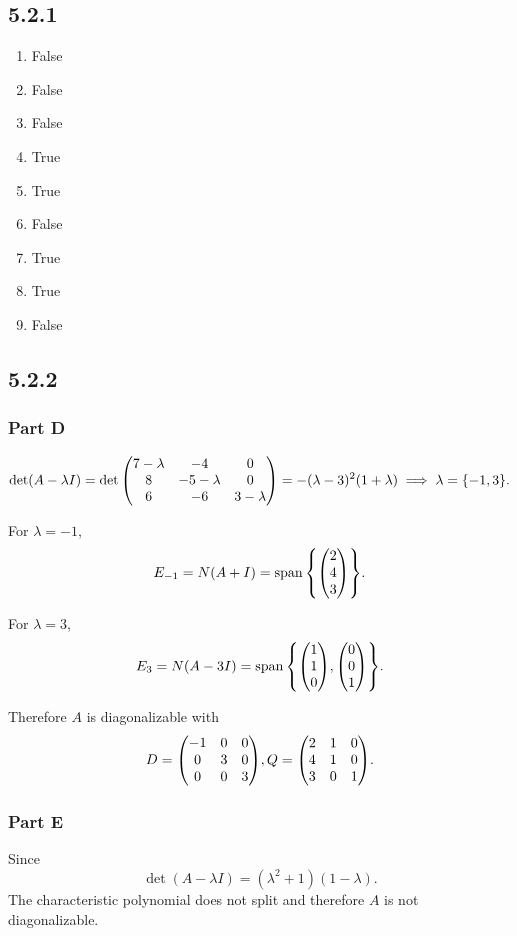 \documentclass[12pt,titlepage]{extarticle}
\begin{document}
\subsection*{5.2.1}
\begin{enumerate}[label=\alph*)]
    \item False
    \item False
    \item False
    \item True
    \item True
    \item False
    \item True
    \item True
    \item False
\end{enumerate}

\subsection*{5.2.2}
\subsubsection*{Part D}
\[
    \det(A - \lambda I) = \det\mqty(
    7 - \lambda & -4 & 0 \\
    8 & -5 - \lambda & 0 \\
    6 & -6 & 3 - \lambda
    ) = -(\lambda - 3)^2 (1 + \lambda) \implies \lambda = \qty{-1, 3}
.\]

For $\lambda = -1$,
\[
    E_{-1} = N(A + I) = \spann\qty{
        \mqty(2 \\ 4 \\ 3)
    }
.\]

For $\lambda = 3$,
\[
    E_3 = N(A - 3I) = \spann\qty{
        \mqty(1 \\ 1 \\ 0),
        \mqty(0 \\ 0 \\ 1)
    }
.\]

Therefore $A$ is diagonalizable with
\[
    D = \mqty(\dmat[0]{-1, 3, 3}), Q = \mqty(
    2 & 1 & 0 \\
    4 & 1 & 0 \\
    3 & 0 & 1
    )
.\]

\subsubsection*{Part E}
Since \[
    \det(A - \lambda I) = (\lambda^2 + 1)(1-\lambda) 
.\]
The characteristic polynomial does not split and therefore $A$ is not diagonalizable.
\end{document}

